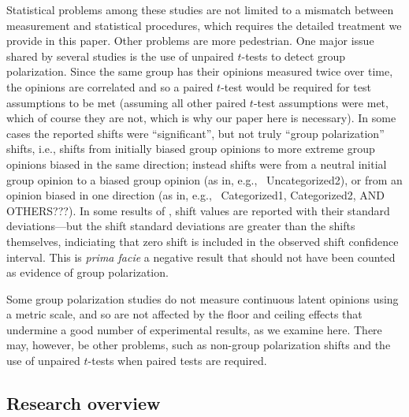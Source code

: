 \documentclass[11pt, letterpaper]{article}
\begin{document}
Statistical problems among these studies are not limited to a mismatch between
measurement and statistical procedures, which requires the detailed treatment
we provide in this paper. Other problems are more pedestrian.
One major issue shared by several studies
is the use of unpaired $t$-tests to detect group polarization. Since the same
group has their opinions measured twice over time, the opinions are correlated
and so a paired $t$-test would be required for test assumptions to be met 
(assuming all other paired $t$-test assumptions were met, 
which of course they are not, which is why our paper here is necessary).
In some cases the reported shifts were ``significant'', 
but not truly ``group polarization'' shifts, i.e., 
shifts from initially biased group opinions
to more extreme group opinions biased in the same direction; instead shifts 
were from a neutral initial group opinion to a biased group opinion 
(as in, e.g.,~ Uncategorized2), or from
an opinion biased in one direction (as in, e.g.,~ Categorized1,
Categorized2, AND OTHERS???). In some results of , 
shift values are reported with their
standard deviations---but the shift standard deviations are greater than the
shifts themselves, indiciating that zero shift is included in the observed
shift confidence interval. This is \emph{prima facie} a negative result that
should not have been counted as evidence of group polarization. 

Some group polarization studies do not measure continuous latent opinions using
a metric scale, and so are not affected by the floor and ceiling effects that
undermine a good number of experimental results, as we examine here. There may,
however, be other problems, such as non-group polarization shifts and the use
of unpaired $t$-tests when paired tests are required.



\subsection{Research overview}
\end{document}
